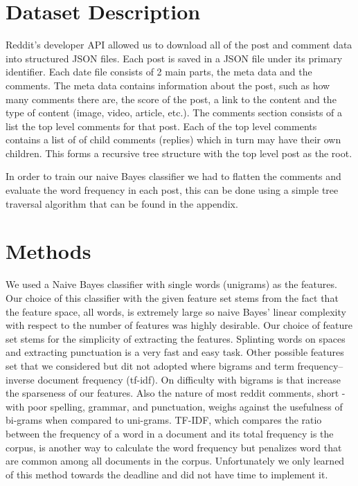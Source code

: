 \documentclass[10pt,twocolumn]{article}
\begin{document}
\section{Dataset Description}

Reddit's developer API allowed us to download all of the post and comment data into structured JSON files. Each post is saved in a JSON file under its primary identifier. Each date file consists of 2 main parts, the meta data and the comments. The meta data contains information about the post, such as how many comments there are, the score of the post, a link to the content and the type of content (image, video, article, etc.). The comments section consists of a list the top level comments for that post. Each of the top level comments contains a list of of child comments (replies) which in turn may have their own children. This forms a recursive tree structure with the top level post as the root. 

In order to train our naive Bayes classifier we had to flatten the comments and evaluate the word frequency in each post, this can be done using a simple tree traversal algorithm that can be found in the appendix. 

\section{Methods}
We used a Naive Bayes classifier with single words (unigrams) as the features. Our choice of this classifier with the given feature set stems from the fact that the feature space, all words, is extremely large so naive Bayes' linear complexity with respect to the number of features was highly desirable. Our choice of feature set stems for the simplicity of extracting the features. Splinting words on spaces and extracting punctuation is a very fast and easy task. Other possible features set that we considered but dit not adopted where bigrams and term frequency–inverse document frequency (tf-idf)\cite{salton1983introduction}. On difficulty with bigrams is that increase the sparseness of our features. Also the nature of most reddit comments, short - with poor spelling, grammar, and punctuation, weighs against the usefulness of bi-grams when compared to uni-grams. TF-IDF, which compares the ratio between the frequency of a word in a document and its total frequency is the corpus, is another way to calculate the word frequency but penalizes word that are common among all documents in the corpus. Unfortunately we only learned of this method towards the deadline and did not have time to implement it.
\end{document}
